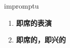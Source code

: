 
\begin{frame}
{\huge impromptu}
\begin{center}
\begin{enumerate}\Large
  \item \textbf{即席的表演}
  \item \textbf{即席的，即兴的}
\end{enumerate}
\end{center}
\end{frame}
